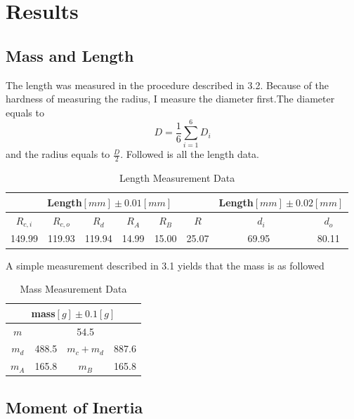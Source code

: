 \documentclass[12pt,a4paper]{article}
\begin{document}
\section{Results}

\subsection{Mass and Length}
The length was measured in the procedure described in 3.2. Because of the hardness of measuring the radius, I measure the diameter first.The diameter equals to $$D=\frac{1}{6}\sum_{i=1}^{6}D_i$$  and the radius equals to  $\frac{D}{2}$. Followed is all the length data. \par
\begin{table}[htbp]
    \centering
    \begin{tabular}{|c|c|c|c|c|c|c|c|}
        \hline
        \multicolumn{6}{|c|}{Length$[mm]\pm0.01[mm]$}&\multicolumn{2}{|c|}{Length$[mm]\pm0.02[mm]$}\\
        \hline
        $R_{c,i}$&$R_{c,o}$&$R_d$&$R_A$&$R_B$&$R$&$d_i$&$d_o$\\ 
        \hline
        149.99&119.93&119.94&14.99&15.00&25.07&~~~~69.95~~~~~&80.11\\
        \hline
    \end{tabular}
    \caption{Length Measurement Data}
\end{table} \par
A simple measurement described in 3.1 yields that the mass is as followed
\begin{table}[H]
    \centering
    \begin{tabular}{|c|c|c|c|}
        \hline
        \multicolumn{4}{|c|}{mass$[g]\pm 0.1[g]$}\\
        \hline
        $m$ & \multicolumn{3}{c|}{54.5}\\ 
        \hline
        $m_d$&488.5&$m_c+m_d$&887.6\\
        \hline
        $m_A$ & 165.8 & $m_B$ & 165.8\\
        \hline
    \end{tabular}
    \caption{Mass Measurement Data}
\end{table} \par



\subsection{Moment of Inertia}
\end{document}
